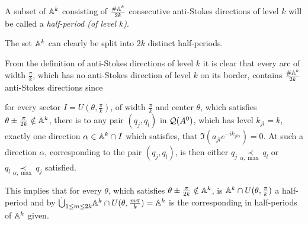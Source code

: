\begin{defn}
  A subset of $\mathbb{A}^k$ consisting of $\frac{\#\mathbb{A}^k}{2k}$ consecutive anti-Stokes
  directions of level $k$ will be called a \emph{half-period (of level $k$)}.
  \begin{s-rem}
    The set $\mathbb{A}^k$ can clearly be split into $2k$ distinct half-periods.
  \end{s-rem}
\end{defn}
From the definition of anti-Stokes directions of level $k$ it is clear that 
every arc of width $\frac{\pi}{k}$, which has no anti-Stokes direction of level
$k$ on its border, contains $\frac{\#\mathbb{A}^k}{2k}$ anti-Stokes directions
since
\begin{einr}
  for every sector $I=U(\theta,\frac{\pi}{k})$, of width $\frac{\pi}{k}$ and
  center $\theta$, which satisfies $\theta\pm\frac{\pi}{2k}\notin\mathbb{A}^k$,
  there is to any pair $(q_j,q_l)$ in $\mathcal{Q}(A^0)$, which has level $k_{jl}=k$,
  exactly one direction $\alpha\in \mathbb{A}^k\cap I$ which satisfies, that
  $\Im(a_{jl}e^{-ik_{jl\alpha}})=0$.
  At such a direction $\alpha$, corresponding to the pair $(q_j,q_l)$, is then
  either $q_j\underset{\alpha,\max}{\prec}q_l$ or
  $q_l\underset{\alpha,\max}{\prec}q_j$ satisfied.
\end{einr}
This implies that for every $\theta$, which satisfies
$\theta\pm\frac{\pi}{2k}\notin\mathbb{A}^k$, is $\mathbb{A}^k\cap U(\theta,\frac{\pi}{k})$
a half-period and by
$\dot\bigcup_{1\leq m\leq 2k}\mathbb{A}^k\cap U(\theta,\frac{m\pi}{k})=\mathbb{A}^k$ is the
corresponding  in half-periods of $\mathbb{A}^k$ given.

